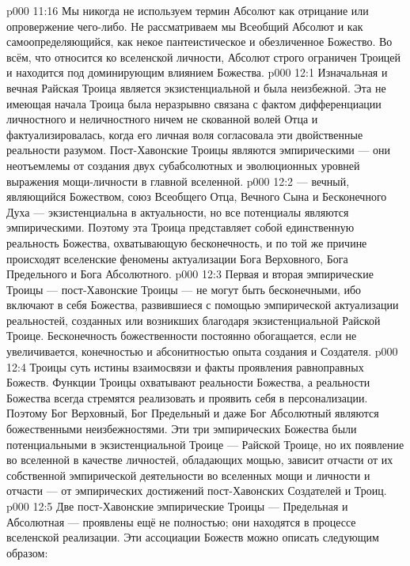 \vs p000 11:16 \pc Мы никогда не используем термин Абсолют как отрицание или опровержение чего\hyp{}либо. Не рассматриваем мы Всеобщий Абсолют и как самоопределяющийся, как некое пантеистическое и обезличенное Божество. Во всём, что относится ко вселенской личности, Абсолют строго ограничен Троицей и находится под доминирующим влиянием Божества.
\vs p000 12:1 Изначальная и вечная Райская Троица является экзистенциальной и была неизбежной. Эта не имеющая начала Троица была неразрывно связана с фактом дифференциации личностного и неличностного ничем не скованной волей Отца и фактуализировалась, когда его личная воля согласовала эти двойственные реальности разумом. Пост\hyp{}Хавонские Троицы являются эмпирическими --- они неотъемлемы от создания двух субабсолютных и эволюционных уровней выражения мощи\hyp{}личности в главной вселенной.
\vs p000 12:2 \pc {} --- вечный, являющийся Божеством, союз Всеобщего Отца, Вечного Сына и Бесконечного Духа --- экзистенциальна в актуальности, но все потенциалы являются эмпирическими. Поэтому эта Троица представляет собой единственную реальность Божества, охватывающую бесконечность, и по той же причине происходят вселенские феномены актуализации Бога Верховного, Бога Предельного и Бога Абсолютного.
\vs p000 12:3 \pc Первая и вторая эмпирические Троицы --- пост\hyp{}Хавонские Троицы --- не могут быть бесконечными, ибо включают в себя  Божества, развившиеся с помощью эмпирической актуализации реальностей, созданных или возникших благодаря экзистенциальной Райской Троице. Бесконечность божественности постоянно обогащается, если не увеличивается, конечностью и абсонитностью опыта создания и Создателя.
\vs p000 12:4 Троицы суть истины взаимосвязи и факты проявления равноправных Божеств. Функции Троицы охватывают реальности Божества, а реальности Божества всегда стремятся реализовать и проявить себя в персонализации. Поэтому Бог Верховный, Бог Предельный и даже Бог Абсолютный являются божественными неизбежностями. Эти три эмпирических Божества были потенциальными в экзистенциальной Троице --- Райской Троице, но их появление во вселенной в качестве личностей, обладающих мощью, зависит отчасти от их собственной эмпирической деятельности во вселенных мощи и личности и отчасти --- от эмпирических достижений пост\hyp{}Хавонских Создателей и Троиц.
\vs p000 12:5 \pc Две пост\hyp{}Хавонские эмпирические Троицы --- Предельная и Абсолютная --- проявлены ещё не полностью; они находятся в процессе вселенской реализации. Эти ассоциации Божеств можно описать следующим образом:
